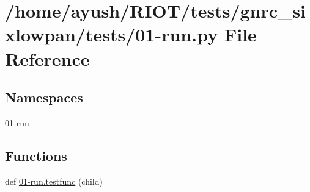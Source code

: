 \hypertarget{gnrc__sixlowpan_2tests_201-run_8py}{}\section{/home/ayush/\+R\+I\+O\+T/tests/gnrc\+\_\+sixlowpan/tests/01-\/run.py File Reference}
\label{gnrc__sixlowpan_2tests_201-run_8py}
\subsection*{Namespaces}
\begin{DoxyCompactItemize}
\item 
 \hyperlink{namespace01-run}{01-\/run}
\end{DoxyCompactItemize}
\subsection*{Functions}
\begin{DoxyCompactItemize}
\item 
def \hyperlink{namespace01-run_aff983ffd4ab0e6bf8e7e58970e4a10bb}{01-\/run.\+testfunc} (child)
\end{DoxyCompactItemize}
